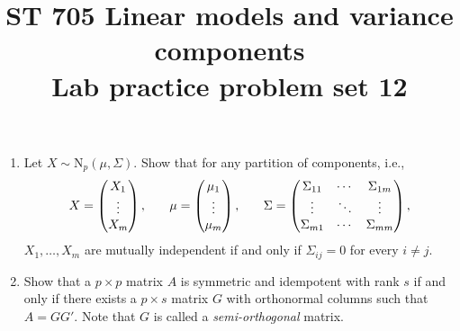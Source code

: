\newtheorem{definition}[theorem]{Definition}\documentclass[11pt]{article}
\title{ST 705 Linear models and variance components \\ 
        Lab practice problem set 12}
\begin{document}
\maketitle

\begin{enumerate}

\item Let $X \sim \text{N}_{p}(\mu, \Sigma)$.  Show that for any partition of components, i.e.,
\[
X = 
\begin{pmatrix}
X_{1} \\
\vdots \\
X_{m} \\
\end{pmatrix}, \hspace{.25in}
\mu = 
\begin{pmatrix}
\mu_{1} \\
\vdots \\
\mu_{m} \\
\end{pmatrix}, \hspace{.25in}
\Sigma = 
\begin{pmatrix}
\Sigma_{11}  & \cdots & \Sigma_{1m} \\
\vdots & \ddots & \vdots \\
\Sigma_{m1}  & \cdots & \Sigma_{mm} \\
\end{pmatrix},
\]
$X_{1}, \dots, X_{m}$ are mutually independent if and only if $\Sigma_{ij} = 0$ for every $i \ne j$.

\item Show that a $p\times p$ matrix $A$ is symmetric and idempotent with rank $s$ if and only if there exists a $p\times s$ matrix $G$ with orthonormal columns such that $A = GG'$.  Note that $G$ is called a {\em semi-orthogonal} matrix.

\end{enumerate}
\end{document}

